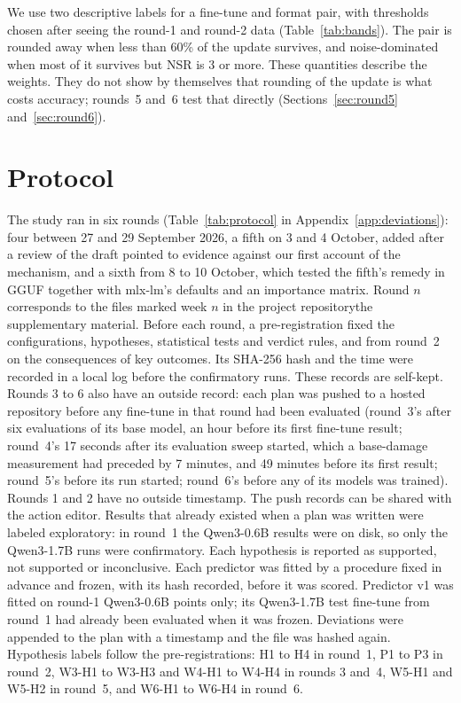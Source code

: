 \documentclass[10pt]{article}
\newcommand{\suppname}{\ifdefined\tmlrpreprint the project repository\else the supplementary material\fi}
\begin{document}
We use two descriptive labels for a fine-tune and format pair, with thresholds chosen after seeing the round-1 and round-2 data (Table~\ref{tab:bands}). The pair is rounded away when less than 60\% of the update survives, and noise-dominated when most of it survives but NSR is 3 or more. These quantities describe the weights. They do not show by themselves that rounding of the update is what costs accuracy; rounds~5 and~6 test that directly (Sections~\ref{sec:round5} and~\ref{sec:round6}).

\section{Protocol}
\label{sec:protocol}

The study ran in six rounds (Table~\ref{tab:protocol} in Appendix~\ref{app:deviations}): four between 27 and 29 September 2026, a fifth on 3 and 4 October, added after a review of the draft pointed to evidence against our first account of the mechanism, and a sixth from 8 to 10 October, which tested the fifth's remedy in GGUF together with mlx-lm's defaults and an importance matrix. Round $n$ corresponds to the files marked week $n$ in \suppname. Before each round, a pre-registration fixed the configurations, hypotheses, statistical tests and verdict rules, and from round~2 on the consequences of key outcomes. Its SHA-256 hash and the time were recorded in a local log before the confirmatory runs. These records are self-kept. Rounds 3 to 6 also have an outside record: each plan was pushed to a hosted repository before any fine-tune in that round had been evaluated (round~3's after six evaluations of its base model, an hour before its first fine-tune result; round~4's 17 seconds after its evaluation sweep started, which a base-damage measurement had preceded by 7 minutes, and 49 minutes before its first result; round~5's before its run started; round~6's before any of its models was trained). Rounds 1 and 2 have no outside timestamp. The push records can be shared with the action editor. Results that already existed when a plan was written were labeled exploratory: in round~1 the Qwen3-0.6B results were on disk, so only the Qwen3-1.7B runs were confirmatory. Each hypothesis is reported as supported, not supported or inconclusive. Each predictor was fitted by a procedure fixed in advance and frozen, with its hash recorded, before it was scored. Predictor v1 was fitted on round-1 Qwen3-0.6B points only; its Qwen3-1.7B test fine-tune from round~1 had already been evaluated when it was frozen. Deviations were appended to the plan with a timestamp and the file was hashed again. Hypothesis labels follow the pre-registrations: H1 to H4 in round~1, P1 to P3 in round~2, W3-H1 to W3-H3 and W4-H1 to W4-H4 in rounds 3 and~4, W5-H1 and W5-H2 in round~5, and W6-H1 to W6-H4 in round~6.
\end{document}
